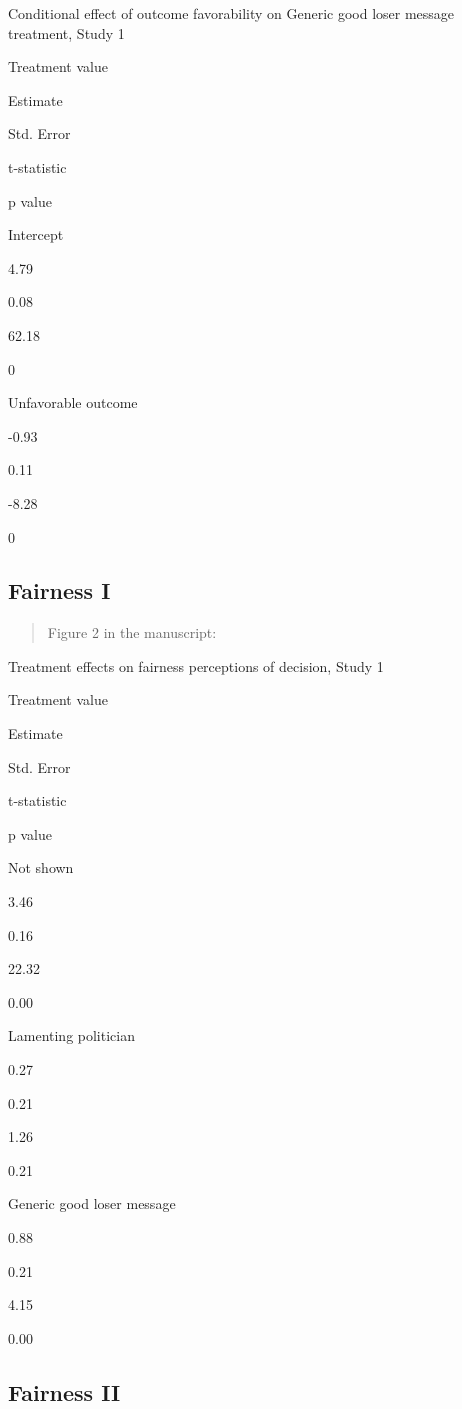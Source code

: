 \documentclass[
]{book}
\begin{document}
Conditional effect of outcome favorability on Generic good loser message
treatment, Study 1

Treatment value

Estimate

Std. Error

t-statistic

p value

Intercept

4.79

0.08

62.18

0

Unfavorable outcome

-0.93

0.11

-8.28

0

\hypertarget{fairness-i}{%
\subsection{Fairness I}\label{fairness-i}}

\begin{quote}
Figure 2 in the manuscript:
\end{quote}

Treatment effects on fairness perceptions of decision, Study 1

Treatment value

Estimate

Std. Error

t-statistic

p value

Not shown

3.46

0.16

22.32

0.00

Lamenting politician

0.27

0.21

1.26

0.21

Generic good loser message

0.88

0.21

4.15

0.00

\hypertarget{fairness-ii}{%
\subsection{Fairness II}\label{fairness-ii}}
\end{document}
